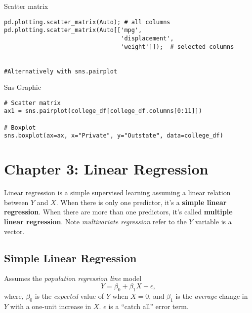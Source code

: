 \documentclass[
  letterpaper,
  DIV=11,
  numbers=noendperiod]{scrreprt}
\begin{document}
Scatter matrix

\begin{verbatim}
pd.plotting.scatter_matrix(Auto); # all columns
pd.plotting.scatter_matrix(Auto[['mpg',
                                 'displacement',
                                 'weight']]);  # selected columns
                                 
                                 
#Alternatively with sns.pairplot

\end{verbatim}

Sns Graphic

\begin{verbatim}
# Scatter matrix
ax1 = sns.pairplot(college_df[college_df.columns[0:11]])

# Boxplot
sns.boxplot(ax=ax, x="Private", y="Outstate", data=college_df)
\end{verbatim}


\chapter{Chapter 3: Linear
Regression}\label{chapter-3-linear-regression}

Linear regression is a simple supervised learning assuming a linear
relation between \(Y\) and \(X\). When there is only one predictor, it's
a \textbf{simple linear regression}. When there are more than one
predictors, it's called \textbf{multiple linear regression}. Note
\emph{multivariate regression} refer to the \(Y\) variable is a vector.

\section{Simple Linear Regression}\label{simple-linear-regression}

Assumes the \emph{population regression line} model \[
Y = \beta_0 + \beta_1 X +\epsilon, 
\] where, \(\beta_0\) is the \emph{expected} value of \(Y\) when
\(X=0\), and \(\beta_1\) is the \emph{average} change in \(Y\) with a
one-unit increase in \(X\). \(\epsilon\) is a ``catch all'' error term.
\end{document}

